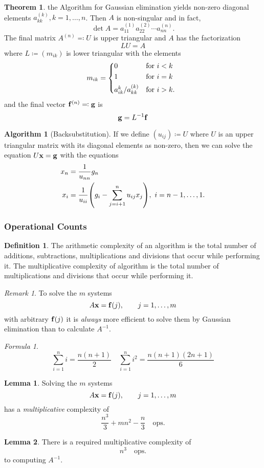 \documentclass[11pt,letterpaper]{article}
\numberwithin{figure}{section} %
\newcommand{\inv}[1]{#1^{-1}}
\newcommand{\ops}{\quad\text{ops.}}
\newcommand{\keyword}[1]{\colorbox{cyan!20!}{#1}}
\theoremstyle{definition}
\newtheorem{theorem}{Theorem}[subsection]
\theoremstyle{definition}
\newtheorem{lemma}{Lemma}[subsection]
\theoremstyle{definition}
\newtheorem{definition}{Definition}[subsection]
\theoremstyle{definition}
\theoremstyle{remark}
\newtheorem*{remark}{Remark}
\theoremstyle{remark}
\theoremstyle{definition}
\newtheorem*{algorithm}{Algorithm}
\theoremstyle{remark}
\newtheorem*{formula}{Formula}
\theoremstyle{remark}
\begin{document}
\begin{multicols*}{3}
\begin{theorem}
	the Algorithm for Gaussian elimination yields non-zero diagonal elements
	$a_{kk}^{(k)}, k = 1, \dots, n$. Then $A$ is non-singular and in fact,
	\[
		\det A = a_{11}^{(1)}a_{22}^{(2)} \cdots a_{nn}^{(n)}.
	\]
	The final matrix $A^{(n)} \eqqcolon U$ is upper triangular and $A$ has the
	factorization
	\[
		LU = A
	\]
	where $L \coloneqq (m_{ik})$ is lower triangular with the elements
	\[
		m_{ik} =
		\begin{cases*}
			0 & for $i < k$ \\
			1 & for $i = k$ \\
			a_{ik}^{k} / a_{kk}^{(k)} & for $i > k$.
		\end{cases*}
	\]
	and the final vector $\vb{f}^{(n)} \eqqcolon \vb{g}$ is 
	\[
		\vb{g} = \inv{L} \vb{f}
	\]
\end{theorem}
\begin{algorithm}[Backsubstitution]
	If we define $(u_{ij}) \coloneqq U$ where $U$ is an upper triangular matrix
	with its diagonal elements as non-zero, then we can solve the equation
	$U\vb{x} = \vb{g}$ with the equations
	\begin{align*}
		x_n &= \frac{1}{u_{nn}}g_n \\
		x_i &= \frac{1}{u_{ii}}\pqty{g_i - \sum_{j = i + 1}^n u_{ij}x_j},~i = n-1, \ldots, 1.
	\end{align*}
\end{algorithm}
\subsubsection{Operational Counts}
\begin{definition}
The \keyword{arithmetic complexity} of an algorithm is the total number of
additions, subtractions, multiplications and divisions that occur while
performing it. The \keyword{multiplicative complexity} of algorithm is the
total number of multiplications and divisions that occur while performing it.
\end{definition}
\begin{remark}
To solve the $m$ systems
\[
	A\vb{x} = \vb{f}(j), \qquad j = 1,\ldots, m
\]
with arbitrary $\vb{f}(j)$ it is \emph{always} more efficient to solve them
by Gaussian elimination than to calculate $\inv{A}$.
\end{remark}
\begin{formula}
	\[
		\sum_{i=1}^n i = \frac{n(n+1)}{2} \quad \sum_{i=1}^n i^2 =
		\frac{n(n+1)(2n+1)}{6}
	\]
\end{formula}
\begin{lemma}
	Solving the $m$ systems
\[
	A\vb{x} = \vb{f}(j), \qquad j = 1,\ldots, m
\]
has a \emph{multiplicative} complexity of 
\[
	\frac{n^3}{3} + mn^2 - \frac{n}{3} \ops
\]
\end{lemma}
\begin{lemma}
	There is a required multiplicative complexity of
	\[
		n^3 \ops
	\]
	to computing $\inv{A}$.
\end{lemma}

\end{multicols*}
\end{document}
